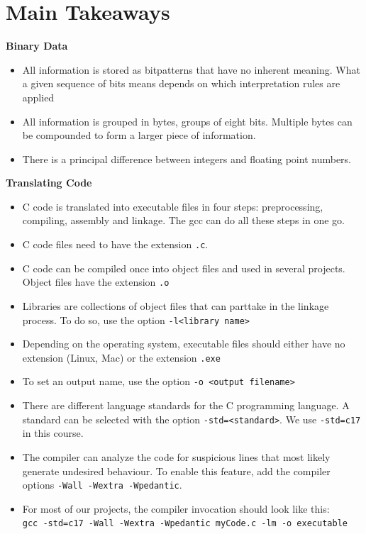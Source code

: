 \section{Main Takeaways} 
\begin{defbox}
\textbf{Binary Data}
\begin{itemize}
\item All information is stored as bitpatterns that have no inherent meaning. What a given sequence of bits means depends on which interpretation rules are applied
\item All information is grouped in bytes, \ie groups of eight bits. Multiple bytes can be compounded to form a larger piece of information.
\item There is a principal difference between integers and floating point numbers.
\end{itemize}

\textbf{Translating Code}
\begin{itemize}
\item C code is translated into executable files in four steps: preprocessing, compiling, assembly and linkage. The gcc can do all these steps in one go.
\item C code files need to have the extension \texttt{.c}.
\item C code can be compiled once into object files and used in several projects. Object files have the extension \texttt{.o}
\item Libraries are collections of object files that can parttake in the linkage process. To do so, use the option \texttt{-l<library name>}
\item Depending on the operating system, executable files should either have no extension (Linux, Mac) or the extension \texttt{.exe}
\item To set an output name, use the option \texttt{-o <output filename>}
\end{itemize}
\end{defbox}
%
\begin{defbox}[]
\begin{itemize}
\item There are different language standards for the C programming language. A standard can be selected with the option \texttt{-std=<standard>}. We use \texttt{-std=c17} in this course.
\item The compiler can analyze the code for suspicious lines that most likely generate undesired behaviour. To enable this feature, add the compiler options \texttt{-Wall -Wextra -Wpedantic}.
\item For most of our projects, the compiler invocation should look like this:\\
	\texttt{gcc -std=c17 -Wall -Wextra -Wpedantic myCode.c -lm -o executable}
\end{itemize}
\end{defbox}

